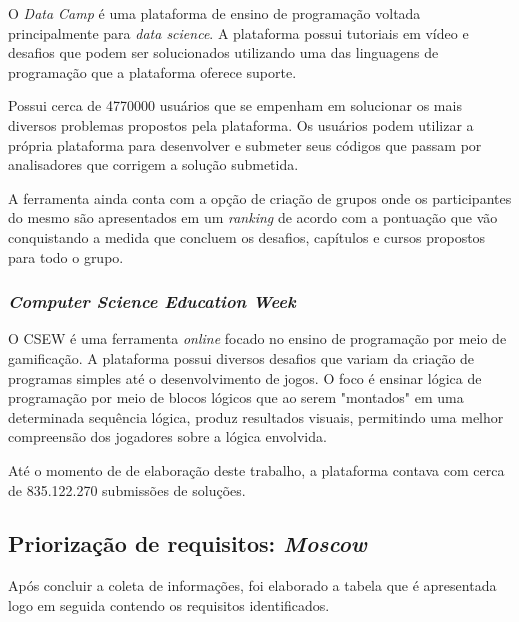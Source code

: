O \textit{Data Camp} é uma plataforma de ensino de programação voltada principalmente para \textit{data science}.
A plataforma possui tutoriais em vídeo e desafios que podem ser solucionados utilizando uma das linguagens de programação
que a plataforma oferece suporte. \cite{datacamp}

Possui cerca de 4770000 usuários que se empenham em solucionar os mais diversos problemas propostos pela plataforma. Os usuários
podem  utilizar a própria plataforma para desenvolver e submeter seus códigos que passam por analisadores que corrigem a solução submetida.

A ferramenta ainda conta com a opção de criação de grupos onde os participantes do mesmo são apresentados em um \textit{ranking} 
de acordo com a pontuação que vão conquistando a medida que concluem os desafios, capítulos e cursos propostos para todo o grupo.

\subsubsection{\textit{Computer Science Education Week}}
O CSEW é uma ferramenta \textit{online} focado no ensino de programação por meio de gamificação. A plataforma possui
diversos desafios que variam da criação de programas simples até o desenvolvimento de jogos. O foco é ensinar lógica de programação 
por meio de blocos lógicos que ao serem "montados" em uma determinada sequência lógica, produz resultados visuais, permitindo uma melhor
compreensão dos jogadores sobre a lógica envolvida.

Até o momento de de elaboração deste trabalho, a plataforma contava com cerca de 835.122.270 submissões de soluções.

\subsection{Priorização de requisitos: \textit{Moscow}}
Após concluir a coleta de informações, foi elaborado a tabela que é apresentada logo em seguida contendo os requisitos
identificados.

